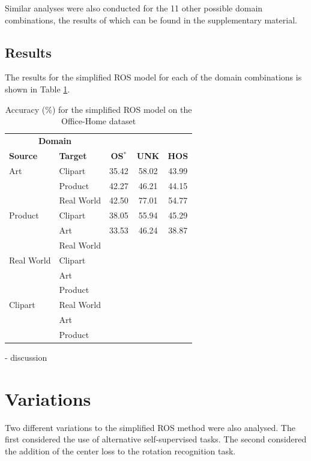 \documentclass[10pt,twocolumn,letterpaper]{article}
\begin{document}
Similar analyses were also conducted for the 11 other possible domain combinations, the results of which can be found in the supplementary material.


\subsection{Results}

The results for the simplified ROS model for each of the domain combinations is shown in Table \ref{tab:results}.

\begin{table}[!htb]
  \centering
  \begin{tabular}{@{}|ll|ccc|@{}}
    \hline
\multicolumn{2}{|c}{\textbf{Domain}} & & & \\
\textbf{Source} & \textbf{Target} & \textbf{OS$^*$} & \textbf{UNK} & \textbf{HOS} \\ \hline
Art & Clipart & 35.42 & 58.02 & 43.99 \\
& Product & 42.27 & 46.21 & 44.15 \\
 & Real World & 42.50 & 77.01 & 54.77 \\ \hline
Product & Clipart & 38.05 & 55.94 & 45.29 \\
& Art & 33.53 & 46.24 & 38.87 \\
& Real World & & & \\ \hline
Real World & Clipart & & & \\
 & Art & & & \\
 & Product & & & \\ \hline
Clipart & Real World & & & \\
 & Art & & & \\
& Product & & & \\
    \hline
  \end{tabular}
  \caption{Accuracy (\%) for the simplified ROS model on the Office-Home dataset}
  \label{tab:results}
\end{table}

- discussion

\section{Variations}
\label{sec:variations}

Two different variations to the simplified ROS method were also analysed. The first considered the use of alternative self-supervised tasks. The second considered the addition of the center loss to the rotation recognition task.
\end{document}
